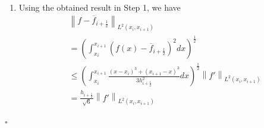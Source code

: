 \documentclass[a4paper]{article}
\numberwithin{equation}{section}
\begin{document}
\begin{enumerate}
\begin{align}
\begin{array}{l}
\end{array} \right)\\
& = \frac{1}{{{h_{i + \frac{1}{2}}}}}\left( \begin{array}{l}
\frac{{{{\left( {x - {x_i}} \right)}^{\frac{3}{2}}}}}{{\sqrt 3 }}{\left( {\int_{{x_i}}^x {f'{{\left( s \right)}^2}ds} } \right)^{\frac{1}{2}}}\\
 + \frac{{{{\left( {{x_{i + 1}} - x} \right)}^{\frac{3}{2}}}}}{{\sqrt 3 }}{\left( {\int_x^{{x_{i + 1}}} {f'{{\left( s \right)}^2}ds} } \right)^{\frac{1}{2}}}
\end{array} \right)\\
& \le \frac{1}{{{h_{i + \frac{1}{2}}}}}{\left( {\frac{{{{\left( {x - {x_i}} \right)}^3} + {{\left( {{x_{i + 1}} - x} \right)}^3}}}{3}} \right)^{\frac{1}{2}}}{\left\| {f'} \right\|_{{L^2}\left( {{x_i},{x_{i + 1}}} \right)}}
\end{align}
\hfill $\square$
\item Using the obtained result in Step 1, we have
\begin{align}
&{\left\| {f - {{\overline f }_{i + \frac{1}{2}}}} \right\|_{{L^2}\left( {{x_i},{x_{i + 1}}} \right)}} \\
&= {\left( {\int_{{x_i}}^{{x_{i + 1}}} {{{\left( {f\left( x \right) - {{\overline f }_{i + \frac{1}{2}}}} \right)}^2}dx} } \right)^{\frac{1}{2}}}\\
& \le {\left( {\int_{{x_i}}^{{x_{i + 1}}} {\frac{{{{\left( {x - {x_i}} \right)}^3} + {{\left( {{x_{i + 1}} - x} \right)}^3}}}{{3h_{i + \frac{1}{2}}^2}}dx} } \right)^{\frac{1}{2}}}{\left\| {f'} \right\|_{{L^2}\left( {{x_i},{x_{i + 1}}} \right)}}\\
 &= \frac{{{h_{i + \frac{1}{2}}}}}{{\sqrt 6 }}{\left\| {f'} \right\|_{{L^2}\left( {{x_i},{x_{i + 1}}} \right)}}
\end{align}
\end{enumerate}
\hfill $\square$\\
\end{document}
